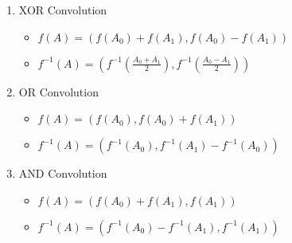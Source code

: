 \begin{enumerate}
    \item XOR Convolution
        \vspace{-1em}
        \begin{itemize}
            \itemsep-0.3em
            \item $f(A) = (f(A_0) + f(A_1), f(A_0) - f(A_1))$
            \item $f^{-1}(A) = (f^{-1}(\frac{A_0 + A_1}{2}), f^{-1}(\frac{A_0 - A_1}{2}))$
        \end{itemize}
    \item OR Convolution
        \vspace{-1em}
        \begin{itemize}
            \itemsep-0.3em
            \item $f(A) = (f(A_0), f(A_0) + f(A_1))$
            \item $f^{-1}(A) = (f^{-1}(A_0), f^{-1}(A_1) - f^{-1}(A_0))$
        \end{itemize}
    \item AND Convolution
        \vspace{-1em}
        \begin{itemize}
            \itemsep-0.3em
            \item $f(A) = (f(A_0) + f(A_1), f(A_1))$
            \item $f^{-1}(A) = (f^{-1}(A_0) - f^{-1}(A_1), f^{-1}(A_1))$
        \end{itemize}
\end{enumerate}
